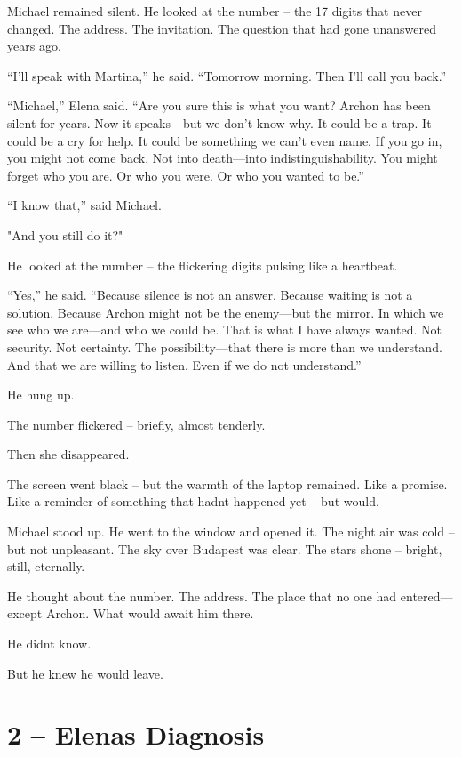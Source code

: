 \documentclass[
]{article}
\begin{document}
Michael remained silent. He looked at the number -- the 17 digits that never changed. The address. The invitation. The question that had gone unanswered years ago.

``I'll speak with Martina,'' he said. ``Tomorrow morning. Then I'll call you back.''

``Michael,'' Elena said. ``Are you sure this is what you want? Archon has been silent for years. Now it speaks---but we don't know why. It could be a trap. It could be a cry for help. It could be something we can't even name. If you go in, you might not come back. Not into death---into indistinguishability. You might forget who you are. Or who you were. Or who you wanted to be.''

``I know that,'' said Michael.

"And you still do it?"

He looked at the number -- the flickering digits pulsing like a heartbeat.

``Yes,'' he said. ``Because silence is not an answer. Because waiting is not a solution. Because Archon might not be the enemy---but the mirror. In which we see who we are---and who we could be. That is what I have always wanted. Not security. Not certainty. The possibility---that there is more than we understand. And that we are willing to listen. Even if we do not understand.''

He hung up.

The number flickered -- briefly, almost tenderly.

Then she disappeared.

The screen went black -- but the warmth of the laptop remained. Like a promise. Like a reminder of something that hadn\textquotesingle t happened yet -- but would.

Michael stood up. He went to the window and opened it. The night air was cold -- but not unpleasant. The sky over Budapest was clear. The stars shone -- bright, still, eternally.

He thought about the number. The address. The place that no one had entered---except Archon. What would await him there.

He didn\textquotesingle t know.

But he knew he would leave.

\section{2 -- Elena\textquotesingle s Diagnosis}\label{elenas-diagnosis}
\end{document}
